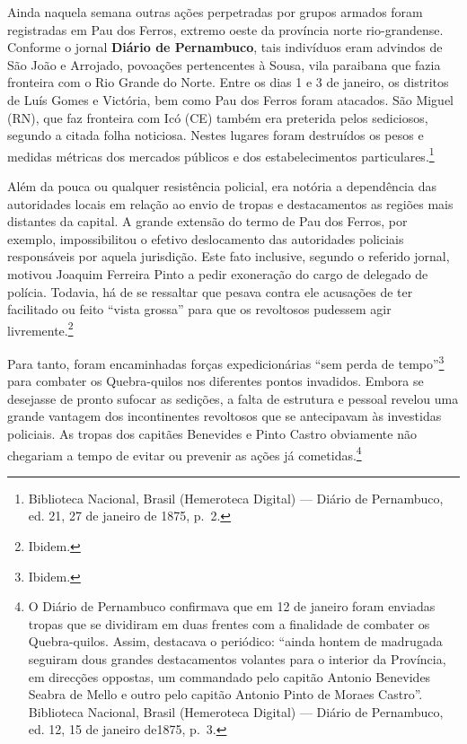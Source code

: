 \begin{refsection}
Ainda naquela semana outras ações perpetradas por grupos armados foram registradas em Pau dos Ferros, extremo oeste da província norte rio-grandense. Conforme o jornal \textbf{Diário de Pernambuco}, tais indivíduos eram advindos de São João e Arrojado, povoações pertencentes à Sousa, vila paraibana que fazia fronteira com o Rio Grande do Norte. Entre os dias 1 e 3 de janeiro, os distritos de Luís Gomes e Victória, bem como Pau dos Ferros foram atacados. São Miguel (RN), que faz fronteira com Icó (CE) também era preterida pelos sediciosos, segundo a citada folha noticiosa. Nestes lugares foram destruídos os pesos e medidas métricas dos mercados públicos e dos estabelecimentos particulares.\footnote{Biblioteca Nacional, Brasil (Hemeroteca Digital) --- Diário de Pernambuco, ed. 21, 27 de janeiro de 1875, p.~2.}

Além da pouca ou qualquer resistência policial, era notória a dependência das autoridades locais em relação ao envio de tropas e destacamentos as regiões mais distantes da capital. A grande extensão do termo de Pau dos Ferros, por exemplo, impossibilitou o efetivo deslocamento das autoridades policiais responsáveis por aquela jurisdição. Este fato inclusive, segundo o referido jornal, motivou Joaquim Ferreira Pinto a pedir exoneração do cargo de delegado de polícia. Todavia, há de se ressaltar que pesava contra ele acusações de ter facilitado ou feito “vista grossa” para que os revoltosos pudessem agir livremente.\footnote{Ibidem.}

Para tanto, foram encaminhadas forças expedicionárias “sem perda de tempo”\footnote{Ibidem.} para combater os Quebra-quilos nos diferentes pontos invadidos. Embora se desejasse de pronto sufocar as sedições, a falta de estrutura e pessoal revelou uma grande vantagem dos incontinentes revoltosos que se antecipavam às investidas policiais. As tropas dos capitães Benevides e Pinto Castro obviamente não chegariam a tempo de evitar ou prevenir as ações já cometidas.\footnote{O Diário de Pernambuco confirmava que em 12 de janeiro foram enviadas tropas que se dividiram em duas frentes com a finalidade de combater os Quebra-quilos. Assim, destacava o periódico: “ainda hontem de madrugada seguiram dous grandes destacamentos volantes para o interior da Província, em direcções oppostas, um commandado pelo capitão Antonio Benevides Seabra de Mello e outro pelo capitão Antonio Pinto de Moraes Castro”. Biblioteca Nacional, Brasil (Hemeroteca Digital) --- Diário de Pernambuco, ed. 12, 15 de janeiro de1875, p.~3.}


\end{refsection}
